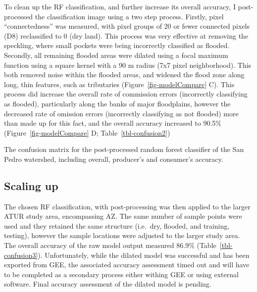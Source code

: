 \documentclass[
]{agujournal2019}
\begin{document}
To clean up the RF classification, and further increase its overall
accuracy, I post-processed the classification image using a two step
process. Firstly, pixel ``connectedness'' was measured, with pixel
groups of 20 or fewer connected pixels (D8) reclassified to 0 (dry
land). This process was very effective at removing the speckling, where
small pockets were being incorrectly classified as flooded. Secondly,
all remaining flooded areas were dilated using a focal maximum function
using a square kernel with a 90 m radius (7x7 pixel neighborhood). This
both removed noise within the flooded areas, and widened the flood zone
along long, thin features, such as tributaries
(Figure~\ref{fig-modelCompare} C). This process did increase the overall
rate of commission errors (incorrectly classifying as flooded),
particularly along the banks of major floodplains, however the decreased
rate of omission errors (incorrectly classifying as not flooded) more
than made up for this fact, and the overall accuracy increased to 90.5\%
(Figure~\ref{fig-modelCompare} D; Table~\ref{tbl-confusion2})

\begin{table}

\caption{\label{tbl-confusion2}The confusion matrix for the
post-processed random forest classifier of the San Pedro watershed,
including overall, producer's and consumer's accuracy.}


\end{table}%

\subsection{Scaling up}\label{scaling-up}

The chosen RF classification, with post-processing was then applied to
the larger ATUR study area, encompassing AZ. The same number of sample
points were used and they retained the same structure (i.e.~dry,
flooded, and training, testing), however the sample locations were
adjusted to the larger study area. The overall accuracy of the raw model
output measured 86.9\% (Table~\ref{tbl-confusion3}). Unfortunately,
while the dilated model was successful and has been exported from GEE,
the associated accuracy assessment timed out and will have to be
completed as a secondary process either withing GEE or using external
software. Final accuracy assessment of the dilated model is pending.
\end{document}
